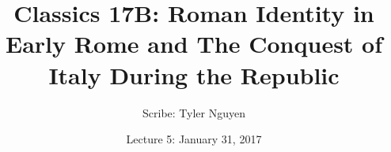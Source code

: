 \documentclass{article}
\begin{document}
\title{Classics 17B: Roman Identity in Early Rome and The Conquest of Italy During the Republic}
\author{Scribe: Tyler Nguyen}
\date{Lecture 5: January 31, 2017}
\maketitle
\end{document}
